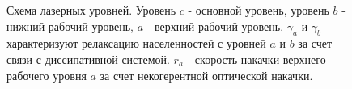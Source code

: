 \begin{figure}
\centering



\caption{Схема лазерных уровней. Уровень $c$ - основной уровень, уровень $b$ -
нижний рабочий уровень, $a$ - верхний рабочий уровень. $\gamma_a$ и $\gamma_b$
характеризуют релаксацию населенностей с уровней $a$ и $b$ за счет
связи с диссипативной системой. $r_a$ - скорость накачки верхнего
рабочего уровня $a$ за счет некогерентной оптической накачки.}
\label{figPart2Laser2_1}
\end{figure}
